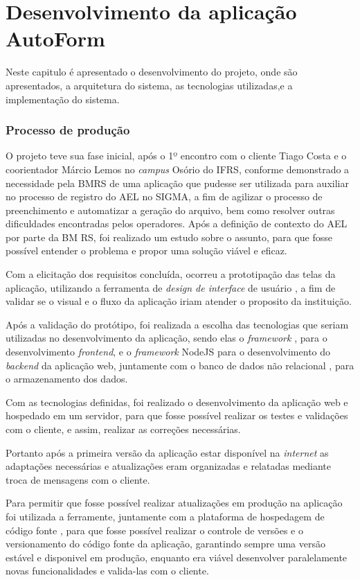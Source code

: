 \chapter{Desenvolvimento da aplicação AutoForm}
Neste capitulo é apresentado o desenvolvimento do projeto, onde são apresentados, a arquitetura do sistema, as tecnologias utilizadas,e a implementação do sistema.

\subsection{Processo de produção}
O projeto teve sua fase inicial, após o 1º encontro com o cliente Tiago Costa e o coorientador Márcio Lemos no \textit{campus} Osório do IFRS, conforme demonstrado a necessidade pela BMRS de uma aplicação que pudesse ser utilizada para auxiliar no processo de registro do AEL no SIGMA, a fim de agilizar o processo de preenchimento e automatizar a geração do arquivo, bem como resolver outras dificuldades encontradas pelos operadores.
Após a definição de contexto do AEL por parte da BM RS, foi realizado um estudo sobre o assunto, para que fosse possível entender o problema e propor uma solução viável e eficaz. 

Com a elicitação dos requisitos concluída, ocorreu a prototipação das telas da aplicação, utilizando a ferramenta de \textit{design de interface } de usuário \cite{figma}, a fim de validar se o visual e o fluxo da aplicação iriam atender o proposito da instituição.

Após a validação do protótipo, foi realizada a escolha das tecnologias que seriam utilizadas no desenvolvimento da aplicação, sendo elas o \textit{framework} \cite{React22:online}, para o desenvolvimento \textit{frontend}, e o \textit{framework} NodeJS \cite{Nodejs} para o desenvolvimento do \textit{backend} da aplicação web, juntamente com o banco de dados não relacional \cite{MongoDBA45:online}, para o armazenamento dos dados.

Com as tecnologias definidas, foi realizado o desenvolvimento da aplicação web e hospedado em um servidor, para que fosse possível realizar os testes e validações com o cliente, e assim, realizar as correções necessárias. 

Portanto após a primeira versão da aplicação estar disponível na \textit{internet} as adaptações necessárias e atualizações eram organizadas e relatadas mediante troca de mensagens com o cliente.

Para permitir que fosse possível realizar atualizações em produção na aplicação foi utilizada a ferramente\cite{git}, juntamente com a plataforma de hospedagem de código fonte \cite{github}, para que fosse possível realizar o controle de versões e o versionamento do código fonte da aplicação, garantindo sempre uma versão estável e disponivel em produção, enquanto era viável desenvolver paralelamente novas funcionalidades e valida-las com o cliente.


